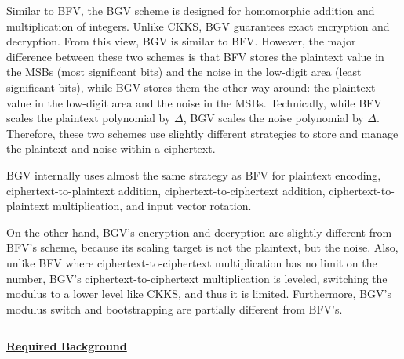 
Similar to BFV, the BGV scheme is designed for homomorphic addition and multiplication of integers. Unlike CKKS, BGV guarantees exact encryption and decryption. From this view, BGV is similar to BFV. However, the major difference between these two schemes is that BFV stores the plaintext value in the MSBs (most significant bits) and the noise in the low-digit area (least significant bits), while BGV stores them the other way around: the plaintext value in the low-digit area and the noise in the MSBs. Technically, while BFV scales the plaintext polynomial by $\Delta$, BGV scales the noise polynomial by $\Delta$. Therefore, these two schemes use slightly different strategies to store and manage the plaintext and noise within a ciphertext. 

BGV internally uses almost the same strategy as BFV for plaintext encoding, ciphertext-to-plaintext addition, ciphertext-to-ciphertext addition, ciphertext-to-plaintext multiplication, and input vector rotation. 

On the other hand, BGV's encryption and decryption are slightly different from BFV's scheme, because its scaling target is not the plaintext, but the noise. Also, unlike BFV where ciphertext-to-ciphertext multiplication has no limit on the number, BGV's ciphertext-to-ciphertext multiplication is leveled, switching the modulus to a lower level like CKKS, and thus it is limited. Furthermore, BGV's modulus switch and bootstrapping are partially different from BFV's. 




$ $

\noindent \textbf{\underline{Required Background}}

